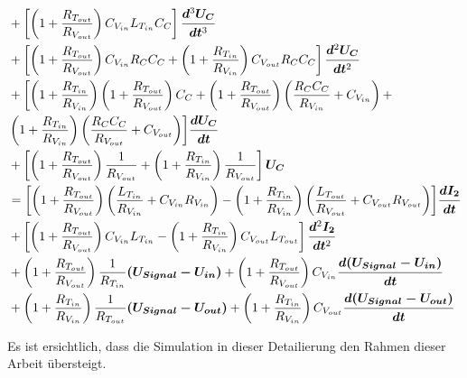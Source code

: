 \documentclass[fontsize=12pt, a4paper]{scrartcl}
\begin{document}
\begin{equation}
	\begin{split}
		&+ \left[\left(1+\frac{R_{T_{out}}}{R_{V_{out}}}\right)C_{V_{in}}L_{T_{in}}C_{C}\right]\bm{\frac{d\textsuperscript{3}U_{C}}{dt\textsuperscript{3}}} \\
		&+ \left[\left(1+\frac{R_{T_{out}}}{R_{V_{out}}}\right)C_{V_{in}}R_{C}C_{C} + \left(1+\frac{R_{T_{in}}}{R_{V_{in}}}\right)C_{V_{out}}R_{C}C_{C}\right]\bm{\frac{d\textsuperscript{2}U_{C}}{dt\textsuperscript{2}}} \\
		&+ \biggl[\left(1+\frac{R_{T_{in}}}{R_{V_{in}}}\right)\left(1+\frac{R_{T_{out}}}{R_{V_{out}}}\right)C_{C} + \left(1+\frac{R_{T_{out}}}{R_{V_{out}}}\right)\left(\frac{R_{C}C_{C}}{R_{V_{in}}}+C_{V_{in}}\right) + \\
		& \left(1+\frac{R_{T_{in}}}{R_{V_{in}}}\right)\left(\frac{R_{C}C_{C}}{R_{V_{out}}}+C_{V_{out}}\right)\biggr] \bm{\frac{dU_{C}}{dt}}  \\
		&+ \left[\left(1+\frac{R_{T_{out}}}{R_{V_{out}}}\right)\frac{1}{R_{V_{out}}} + \left(1+\frac{R_{T_{in}}}{R_{V_{in}}}\right)\frac{1}{R_{V_{out}}}\right]\bm{U_{C}} \\
		&= \biggl[\left(1+\frac{R_{T_{out}}}{R_{V_{out}}}\right)\left(\frac{L_{T_{in}}}{R_{V_{in}}}+C_{V_{in}}R_{V_{in}}\right) - \left(1+\frac{R_{T_{in}}}{R_{V_{in}}}\right)\left(\frac{L_{T_{out}}}{R_{V_{out}}}+C_{V_{out}}R_{V_{out}}\right)\biggr]\bm{\frac{dI_{2}}{dt}} \\
		&+ \left[\left(1+\frac{R_{T_{out}}}{R_{V_{out}}}\right)C_{V_{in}}L_{T_{in}} - \left(1+\frac{R_{T_{in}}}{R_{V_{in}}}\right)C_{V_{out}}L_{T_{out}}\right]\bm{\frac{d\textsuperscript{2}I_{2}}{dt\textsuperscript{2}}} \\
		&+ \left(1+\frac{R_{T_{out}}}{R_{V_{out}}}\right)\frac{1}{R_{T_{in}}}\bm{(U_{Signal} - U_{in})}+ \left(1+\frac{R_{T_{out}}}{R_{V_{out}}}\right)C_{V_{in}}\bm{\frac{d(U_{Signal} - U_{in})}{dt}} \\
		&+ \left(1+\frac{R_{T_{in}}}{R_{V_{in}}}\right)\frac{1}{R_{T_{out}}}\bm{(U_{Signal} - U_{out})} + \left(1+\frac{R_{T_{in}}}{R_{V_{in}}}\right)C_{V_{out}}\bm{\frac{d(U_{Signal} - U_{out})}{dt}}
	\end{split}
\end{equation}


Es ist ersichtlich, dass die Simulation in dieser Detailierung den Rahmen dieser Arbeit übersteigt.


\printbibliography
\end{document}
